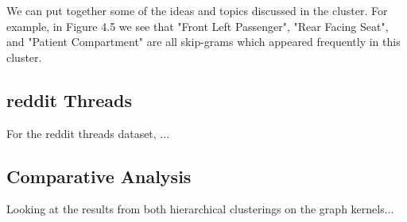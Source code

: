 We can put together some of the ideas and topics discussed in the cluster. For example, in Figure 4.5 we see that "Front Left Passenger", "Rear Facing Seat", and "Patient Compartment" are all skip-grams which appeared frequently in this cluster.\\


\subsection{reddit Threads}

For the reddit threads dataset, ...\\


\subsection{Comparative Analysis}

Looking at the results from both hierarchical clusterings on the graph kernels...\\
 


